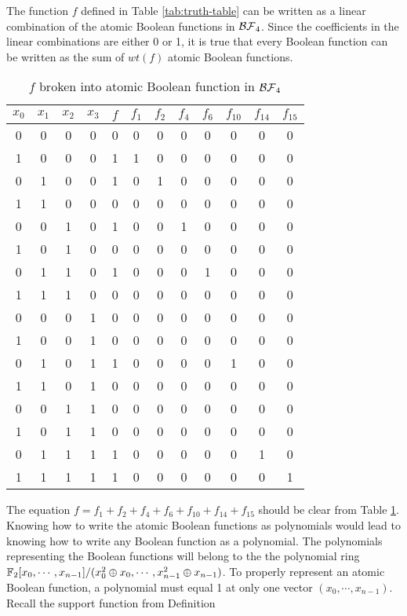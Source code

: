 \par The function $f$ defined in Table \ref{tab:truth-table} can be written
as a linear combination of the atomic Boolean functions in $\mathcal{BF}_4$. Since
the coefficients in the linear combinations are either 0 or 1, it is true
that every Boolean function can be written as the sum of $wt(f)$ atomic
Boolean functions.
\begin{table}[h!]
  \centering
  \begin{tabular}{|c|c|c|c||c|c|c|c|c|c|c|c|}
    \hline
    $x_0$&$x_1$&$x_2$&$x_3$
      &$f$&$f_1$&$f_2$&$f_4$&$f_6$&$f_{10}$&$f_{14}$&$f_{15}$\\
    \hline
    0&0&0&0&0&0&0&0&0&0&0&0\\
    1&0&0&0&1&1&0&0&0&0&0&0\\
    0&1&0&0&1&0&1&0&0&0&0&0\\
    1&1&0&0&0&0&0&0&0&0&0&0\\
    0&0&1&0&1&0&0&1&0&0&0&0\\
    1&0&1&0&0&0&0&0&0&0&0&0\\
    0&1&1&0&1&0&0&0&1&0&0&0\\
    1&1&1&0&0&0&0&0&0&0&0&0\\
    0&0&0&1&0&0&0&0&0&0&0&0\\
    1&0&0&1&0&0&0&0&0&0&0&0\\
    0&1&0&1&1&0&0&0&0&1&0&0\\
    1&1&0&1&0&0&0&0&0&0&0&0\\
    0&0&1&1&0&0&0&0&0&0&0&0\\
    1&0&1&1&0&0&0&0&0&0&0&0\\
    0&1&1&1&1&0&0&0&0&0&1&0\\
    1&1&1&1&1&0&0&0&0&0&0&1\\
    \hline
  \end{tabular}
  \caption{$f$ broken into atomic Boolean function in $\mathcal{BF}_4$}
  \label{tab:atomic-f}
\end{table}
\par The equation $f=f_1+f_2+f_4+f_6+f_{10}+f_{14}+f_{15}$ should be clear
from Table \ref{tab:atomic-f}. Knowing how to write the atomic Boolean
functions as polynomials would lead to knowing how to write any Boolean
function as a polynomial. The polynomials representing the Boolean functions
will belong to the the polynomial ring $\mathbb{F}_2[x_0,\cdots,x_{n-1}]/
(x_0^2\oplus x_0,\cdots,x_{n-1}^2\oplus x_{n-1})$. To properly represent
an atomic Boolean function, a polynomial must equal 1 at only one vector
$(x_0,\cdots,x_{n-1})$. Recall the support function from Definition

